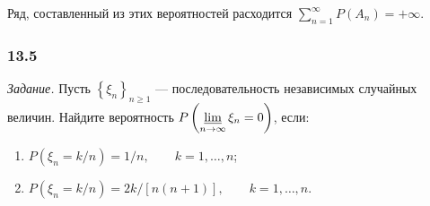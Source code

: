 Ряд, составленный из этих вероятностей расходится $ \sum \limits_{n=1}^{ \infty } P \left( A_n \right) = + \infty $.

\subsubsection*{13.5}

\textit{Задание.} Пусть $ \left\{ \xi_n \right\}_{n \geq 1}$ --- последовательность независимых случайных величин.
Найдите вероятность $P \left( \varliminf \limits_{n \to \infty } \xi_n = 0 \right) $, если:
\begin{enumerate}[label=\alph*)]
\item $P \left( \xi_n = k/n \right) = 1/n, \qquad k = 1, \dotsc, n$;
\item $P \left( \xi_n = k/n \right) = 2k/\left[ n \left( n+1 \right) \right], \qquad k = 1, \dotsc, n$.
\end{enumerate}

